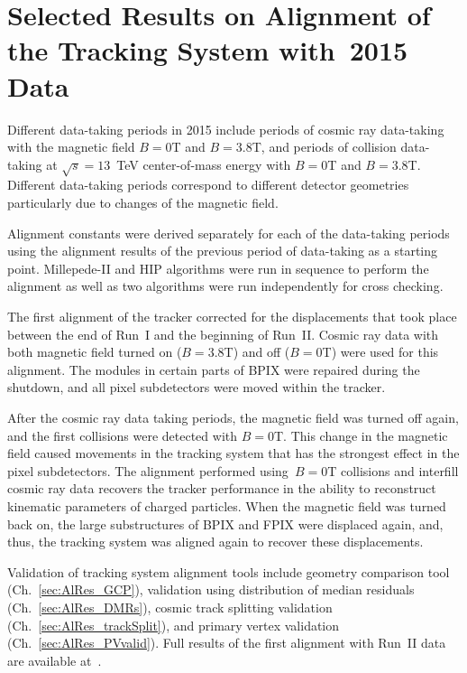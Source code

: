 \section{Selected Results on Alignment of the Tracking System with~2015 Data}
\label{sec:alignmentResults}

Different data-taking periods in 2015 include periods of cosmic ray data-taking with the magnetic field $B=0$T and $B=3.8$T, and periods of collision data-taking at $\sqrt{s}=13$~TeV center-of-mass energy with $B=0$T and $B=3.8$T. Different data-taking periods correspond to different detector geometries particularly due to changes of the magnetic field. 

Alignment constants were derived separately for each of the data-taking periods using the alignment results of the previous period of data-taking as a starting point. Millepede-II and HIP algorithms were run in sequence to perform the alignment as well as two algorithms were run independently for cross checking. 

The first alignment of the tracker corrected for the displacements that took place between the end of Run~I and the beginning of Run~II. Cosmic ray data with both magnetic field turned on ($B=3.8$T) and off ($B=0$T) were used for this alignment. The modules in certain parts of BPIX were repaired during the shutdown, and all pixel subdetectors were moved within the tracker. 

After the cosmic ray data taking periods, the magnetic field was turned off again, and the first collisions were detected with $B=0$T. This change in the magnetic field caused movements in the tracking system that has the strongest effect in the pixel subdetectors. The alignment performed using~$B=0$T collisions and interfill cosmic ray data recovers the tracker performance in the ability to reconstruct kinematic parameters of charged particles. When the magnetic field was turned back on, the large substructures of BPIX and FPIX were displaced again, and, thus, the tracking system was aligned again to recover these displacements.  

Validation of tracking system alignment tools include geometry comparison tool (Ch.~\ref{sec:AlRes_GCP}), validation using distribution of median residuals (Ch.~\ref{sec:AlRes_DMRs}), cosmic track splitting validation (Ch.~\ref{sec:AlRes_trackSplit}), and primary vertex validation (Ch.~\ref{sec:AlRes_PVvalid}). Full results of the first alignment with Run~II data are available at~\cite{ref_AlApproved_twiki}.

